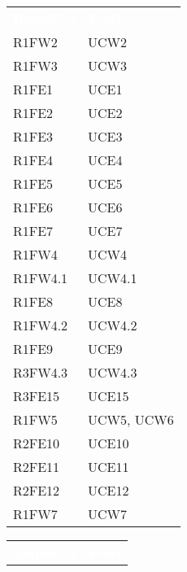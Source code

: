 \begin{table}[!htbp]
\renewcommand{\arraystretch}{1.5}
\begin{tabular}[t]{ m{}<{\centering}  m{}<{\centering} }
	\rowcolor{darkblue}
	\textcolor{white}{\textbf{Requisito}} &\textcolor{white}{\textbf{Fonti}}\\ 	
	 
	R1FW2 & UCW2\\	

	R1FW3 & UCW3\\	
	 
	R1FE1 & UCE1\\	
	 
 	R1FE2 & UCE2\\	
	 
	R1FE3 & UCE3\\	

	R1FE4 & UCE4\\	
	
	R1FE5 & UCE5 \\
	 
	R1FE6 & UCE6 \\	 
	 
	R1FE7 & UCE7\\	

	R1FW4 & UCW4 \\ 
	 
	R1FW4.1 & UCW4.1\\	
	 
	R1FE8 & UCE8\\	
	 
	R1FW4.2 & UCW4.2\\		 

	R1FE9 & UCE9 \\		
	 
	R3FW4.3 & UCW4.3\\				
	 
	R3FE15 & UCE15\\			
	  	 	 	
	R1FW5 & UCW5, UCW6\\		
	 
	R2FE10 & UCE10\\
	
	R2FE11 & UCE11\\
	 
	R2FE12 & UCE12\\	
	
	R1FW7 & UCW7\\


\end{tabular}
\begin{tabular}[t]{ m{}<{\centering}  m{}<{\centering} }
	\rowcolor{darkblue}
	\textcolor{white}{\textbf{Requisito}} &\textcolor{white}{\textbf{Fonti}}\\ 			 
	 

\end{tabular}
\end{table}
